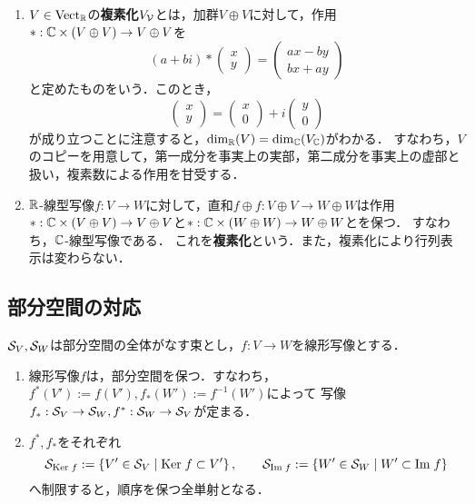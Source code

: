 \documentclass[uplatex,dvipdfmx]{jsreport}
\begin{document}
\begin{example}[複素化]\mbox{}
    \begin{enumerate}
        \item $V\in\Vect_\R$の\textbf{複素化}$V_\V$とは，加群$V\oplus V$に対して，作用$*:\C\times (V\oplus V)\to V\oplus V$を
        \[(a+bi)*\begin{pmatrix}x\\y\end{pmatrix}=\begin{pmatrix}ax-by\\bx+ay\end{pmatrix}\]
        と定めたものをいう．このとき，
        \[\begin{pmatrix}x\\y\end{pmatrix}=\begin{pmatrix}x\\0\end{pmatrix}+i\begin{pmatrix}
            y\\0
        \end{pmatrix}\]
        が成り立つことに注意すると，$\dim_\R(V)=\dim_\C(V_\C)$がわかる．
        すなわち，$V$のコピーを用意して，第一成分を事実上の実部，第二成分を事実上の虚部と扱い，複素数による作用を甘受する．
        \item $\R$-線型写像$f:V\to W$に対して，直和$f\oplus f:V\oplus V\to W\oplus W$は作用$*:\C\times (V\oplus V)\to V\oplus V$と$*:\C\times(W\oplus W)\to W\oplus W$とを保つ．
        すなわち，$\C$-線型写像である．
        これを\textbf{複素化}という．また，複素化により行列表示は変わらない．
    \end{enumerate}
\end{example}

\subsection{部分空間の対応}

\begin{proposition}
    $\S_V,\S_W$は部分空間の全体がなす束とし，$f:V\to W$を線形写像とする．
    \begin{enumerate}
        \item 線形写像$f$は，部分空間を保つ．すなわち，$f^*(V'):=f(V'),f_*(W'):=f^{-1}(W')$によって
        写像$f_*:\S_V\to\S_W,f^*:\S_W\to\S_V$が定まる．
        \item $f^*,f_*$をそれぞれ
        \[\S_{\Ker f}:=\Brace{V'\in\S_V\mid \Ker f\subset V'},\qquad\S_{\Im f}:=\Brace{W'\in\S_W\mid W'\subset\Im f}\]
        へ制限すると，順序を保つ全単射となる．
    \end{enumerate}
\end{proposition}
\end{document}
